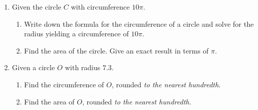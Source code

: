 \documentclass[12pt, twoside]{article}
\begin{document}
\begin{enumerate}
      \item Given the circle $C$ with circumference $10\pi$.
    \begin{enumerate}
      \item Write down the formula for the circumference of a circle and solve for the radius yielding a circumference of $10\pi$. \vspace{2cm}
      \item Find the area of the circle. Give an exact result in terms of $\pi$.
    \end{enumerate}

    \item Given a circle $O$ with radius $7.3$.
    \begin{enumerate}
      \item Find the circumference of $O$, rounded \emph{to the nearest hundredth}. \vspace{2cm}
      \item Find the area of $O$, rounded \emph{to the nearest hundredth}. \vspace{2cm}
    \end{enumerate}



  \end{enumerate}

  
\end{document}
